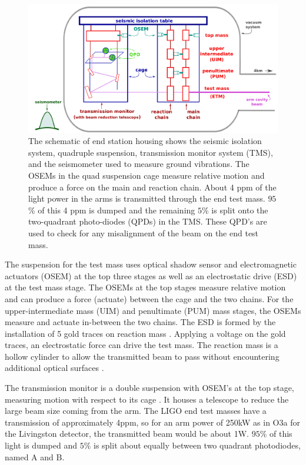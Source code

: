 \documentclass[12pt]{iopart}
\begin{document}
\begin{figure}
    \centering
    \includegraphics[width=\textwidth]{EndStationDiagram3.png}
    \caption{The schematic of end station housing shows the seismic isolation system, quadruple suspension, transmission monitor system (TMS), and the seismometer used to measure ground vibrations. The OSEMs in the quad suspension cage measure relative motion and produce a force on the main and reaction chain. About 4 ppm of the light power in the arms is transmitted through the end test mass. $95$\% of this 4 ppm is dumped and the remaining $5$\% is split onto the two-quadrant photo-diodes (QPDs) in the TMS. These QPD's are used to check for any misalignment of the beam on the end test mass. }
    \label{fig:end_station}
\end{figure}
The suspension for the test mass uses optical shadow sensor and electromagnetic actuators (OSEM)  at the top three stages as well as an electrostatic drive (ESD) at the test mass stage. The OSEMs at the top stages measure relative motion and can produce a force (actuate) between the cage and the two chains. For the upper-intermediate mass (UIM) and penultimate (PUM) mass stages, the OSEMs measure and actuate in-between the two chains. The ESD is formed by the installation of 5 gold traces on reaction mass \cite{esd_schematic}. Applying a voltage on the gold traces, an electrostatic force can drive the test mass.  The reaction mass is a hollow cylinder to allow the transmitted beam to pass without encountering additional optical surfaces \cite{aerm_schematic}.

The transmission monitor is a double suspension with OSEM's at the top stage, measuring motion with respect to its cage \cite{Barsotti_2010}. It houses a telescope to reduce the large beam size coming from the arm. The LIGO end test masses have a transmission of approximately 4ppm, so for an arm power of 250kW as in O3a for the Livingston detector, the transmitted beam would be about 1W. $95\%$ of this light is dumped and $5\%$ is split about equally between two quadrant photodiodes, named A and B. 
\end{document}
